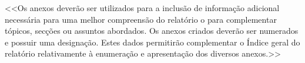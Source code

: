 \documentclass[a4paper,12pt]{scrreprt}
\begin{document}

\printnomenclature







    <<Os anexos deverão ser utilizados para a inclusão de informação adicional necessária para uma melhor compreensão do relatório o para complementar tópicos, secções ou assuntos abordados. Os anexos criados deverão ser numerados e possuir uma designação. Estes dados permitirão complementar o Índice geral do relatório relativamente à enumeração e apresentação dos diversos anexos.>>
    


\end{document}

